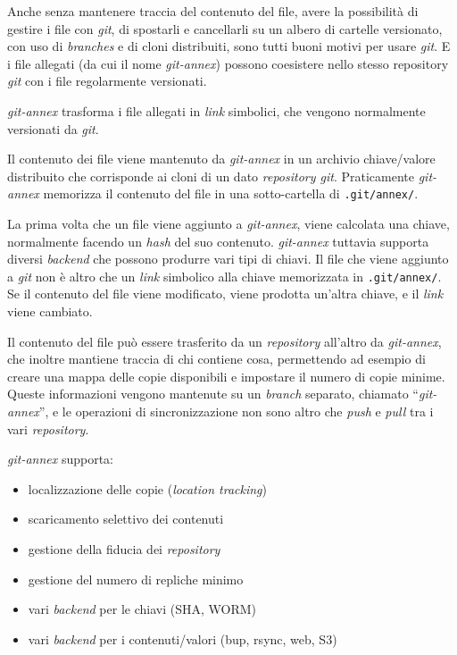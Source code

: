 Anche senza mantenere traccia del contenuto del file, avere la 
possibilità di gestire i file con \emph{git}, di spostarli e cancellarli su un
albero di cartelle versionato, con uso di \emph{branches} e di cloni
distribuiti, sono tutti buoni motivi per usare \emph{git}. E i file allegati
(da cui il nome \emph{git-annex}) possono coesistere nello stesso repository
\emph{git} con i file regolarmente versionati.

\emph{git-annex} trasforma i file allegati in \emph{link}
simbolici, che vengono normalmente versionati da \emph{git}. 

Il contenuto dei file viene mantenuto da \emph{git-annex} in un
archivio chiave/valore distribuito che corrisponde ai cloni di un
dato \emph{repository git}. Praticamente \emph{git-annex} memorizza il
contenuto del file in una sotto-cartella di \verb|.git/annex/|.

La prima volta che un file viene aggiunto a \emph{git-annex}, viene
calcolata una chiave, normalmente facendo un \emph{hash} del suo
contenuto. \emph{git-annex} tuttavia supporta diversi \emph{backend}
che possono produrre vari tipi di chiavi. Il file che viene aggiunto a
\emph{git} non è altro che un \emph{link} simbolico alla chiave
memorizzata in \verb|.git/annex/|. Se il contenuto del file viene
modificato, viene prodotta un'altra chiave, e il \emph{link} viene
cambiato.

Il contenuto del file può essere trasferito da un \emph{repository}
all'altro da \emph{git-annex}, che inoltre mantiene traccia di chi
contiene cosa, permettendo ad esempio di creare una mappa delle copie
disponibili e impostare il numero di copie minime. Queste informazioni
vengono mantenute su un \emph{branch} separato, chiamato
``\emph{git-annex}'', e le operazioni di sincronizzazione non sono
altro che \emph{push} e \emph{pull} tra i vari \emph{repository}.

\emph{git-annex} supporta:
\begin{itemize}
\item localizzazione delle copie (\emph{location tracking})
\item scaricamento selettivo dei contenuti
\item gestione della fiducia dei \emph{repository}
\item gestione del numero di repliche minimo 
\item vari \emph{backend} per le chiavi (SHA, WORM)
\item vari \emph{backend} per i contenuti/valori (bup, rsync, web, S3)
\end{itemize}

